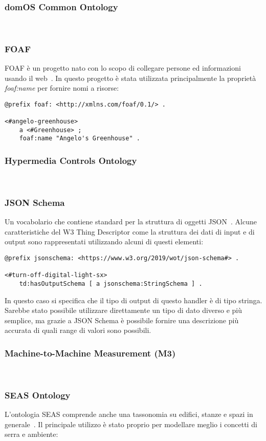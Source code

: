 \subsubsection{domOS Common Ontology}
~\cite{domOSCom57:online}
\subsubsection{FOAF}
FOAF è un progetto nato con lo scopo di collegare persone ed informazioni usando il web~\cite{FOAFVoca16:online}.
In questo progetto è stata utilizzata principalmente la proprietà \textit{foaf:name} per fornire nomi a risorse:
\begin{verbatim}
@prefix foaf: <http://xmlns.com/foaf/0.1/> .

<#angelo-greenhouse>
	a <#Greenhouse> ;
	foaf:name "Angelo's Greenhouse" .
\end{verbatim}

\subsubsection{Hypermedia Controls Ontology}
~\cite{Hypermed84:online}
\subsubsection{JSON Schema}
Un vocabolario che contiene standard per la struttura di oggetti JSON~\cite{JSONSche6:online}. Alcune caratteristiche del W3 Thing Descriptor come la struttura dei dati di input e di output sono rappresentati utilizzando alcuni di questi elementi:
\begin{verbatim}
@prefix jsonschema: <https://www.w3.org/2019/wot/json-schema#> .

<#turn-off-digital-light-sx>
	td:hasOutputSchema [ a jsonschema:StringSchema ] .
\end{verbatim}

\noindent In questo caso si specifica che il tipo di output di questo handler è di tipo stringa. Sarebbe stato possibile utilizzare direttamente un tipo di dato diverso e più semplice, ma grazie a JSON Schema è possibile fornire una descrizione più accurata di quali range di valori sono possibili.

\subsubsection{Machine-to-Machine Measurement (M3)}
~\cite{SWoTSema18:online}
\subsubsection{SEAS Ontology}
L'ontologia SEAS comprende anche una tassonomia su edifici, stanze e spazi in generale~\cite{SEAS:online}. Il principale utilizzo è stato proprio per modellare meglio i concetti di serra e ambiente:


